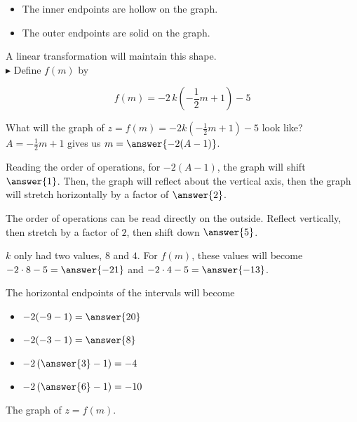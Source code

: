\documentclass{ximera}
\begin{document}
\begin{example}
\begin{itemize}
\item The inner endpoints are hollow on the graph.

\item The outer endpoints are solid on the graph.


\end{itemize}

A linear transformation will maintain this shape. \\





$\blacktriangleright$  Define $f(m)$ by 


\[
f(m) = -2 \, k\left(-\frac{1}{2} m + 1\right) - 5
\]



What will the graph of $z = f(m) = -2 k\left(-\frac{1}{2} m + 1\right) - 5$ look like? \\



$A = -\frac{1}{2} m + 1$  gives us $m = \answer{-2(A-1)}$. 

Reading the order of operations, for $-2(A-1)$, the graph will shift  $\answer{1}$. Then, the graph will reflect about the vertical axis, then the graph will stretch horizontally by a factor of $\answer{2}$.



The order of operations can be read directly on the outside.  Reflect vertically, then stretch by a factor of $2$, then shift down $\answer{5}$.

$k$ only had two values, $8$ and $4$. For $f(m)$, these values will become $-2 \cdot 8 - 5 = \answer{-21}$ and $-2 \cdot 4 - 5 = \answer{-13}$.  

The horizontal endpoints of the intervals will become


\begin{itemize}
\item $-2(-9-1) = \answer{20}$
\item $-2(-3-1) = \answer{8}$
\item $-2 \left( \answer{3}-1 \right) = -4$
\item $-2 \left(\answer{6}-1 \right) = -10$
\end{itemize}






The graph of $z = f(m)$.





\end{example}
\end{document}
